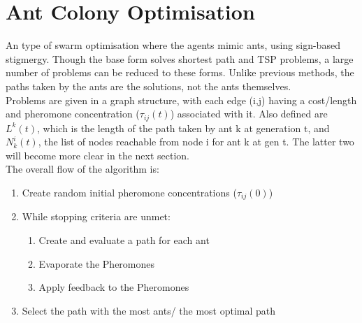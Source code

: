 \section{Ant Colony Optimisation}
An type of swarm optimisation where the agents mimic ants, using sign-based stigmergy. Though the base form solves shortest path and TSP problems, a large number of problems can be reduced to these forms. Unlike previous methods, the paths taken by the ants are the solutions, not the ants themselves.\\
Problems are given in a graph structure, with each edge (i,j) having a cost/length and pheromone concentration ($\tau_{ij}(t)$) associated with it. Also defined are $L^k(t)$, which is the length of the path taken by ant k at generation t, and $N^i_k(t)$, the list of nodes reachable from node i for ant k at gen t. The latter two will become more clear in the next section. \\
The overall flow of the algorithm is: 
\begin{enumerate}[label=\Alph*]
\item Create random initial pheromone concentrations ($\tau_{ij}(0)$)
\item While stopping criteria are unmet:
\begin{enumerate}[label=\arabic*]
    \item Create and evaluate a path for each ant 
    \item Evaporate the Pheromones
    \item Apply feedback to the Pheromones 
\end{enumerate}
\item Select the path with the most ants/ the most optimal path\\
\end{enumerate}


